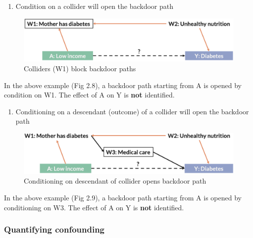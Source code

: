 \documentclass[
]{book}
\providecommand{\tightlist}{%
  \setlength{\itemsep}{0pt}\setlength{\parskip}{0pt}}
\begin{document}
\begin{enumerate}
\def\labelenumi{\arabic{enumi}.}
\setcounter{enumi}{4}
\tightlist
\item
  Condition on a collider will open the backdoor path
\end{enumerate}

\begin{figure}

{\centering \includegraphics[width=1\linewidth]{img/confounding/dag_rules_5} 

}

\caption{Colliders (W1) block backdoor paths}\label{fig:unnamed-chunk-10}
\end{figure}

In the above example (Fig 2.8), a backdoor path starting from A is opened by condition on W1. The effect of A on Y is \textbf{not} identified.

\begin{enumerate}
\def\labelenumi{\arabic{enumi}.}
\setcounter{enumi}{5}
\tightlist
\item
  Conditioning on a descendant (outcome) of a collider will open the backdoor path
\end{enumerate}

\begin{figure}

{\centering \includegraphics[width=1\linewidth]{img/confounding/dag_rules_6} 

}

\caption{Conditioning on descendant of collider opens backdoor path}\label{fig:unnamed-chunk-11}
\end{figure}

In the above example (Fig 2.9), a backdoor path starting from A is opened by conditioning on W3. The effect of A on Y is \textbf{not} identified.

\hypertarget{quantifying-confounding}{%
\subsubsection{Quantifying confounding}\label{quantifying-confounding}}
\end{document}
